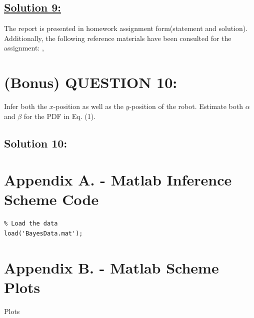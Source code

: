 \documentclass[a4paper,11pt]{article}
\begin{document}
\subsection*{\underline{Solution 9:}}
The report is presented in homework assignment form(statement and solution). Additionally, the following reference materials have been consulted for the assignment: \cite{leon2017probability}, \cite{bishop2006pattern}

\section{(Bonus) QUESTION 10:}
Infer both the $x$-position as well as the $y$-position of the robot. Estimate both $\alpha$ and $\beta$ for the PDF in Eq. (1).
\subsection*{Solution 10:}






\newpage
\appendix

\makeatother
\section{Appendix A. - Matlab Inference Scheme Code}
\begin{lstlisting}
% Load the data
load('BayesData.mat');
\end{lstlisting}

\newpage
\section{Appendix B. - Matlab Scheme Plots}
	Plots
\end{document}

